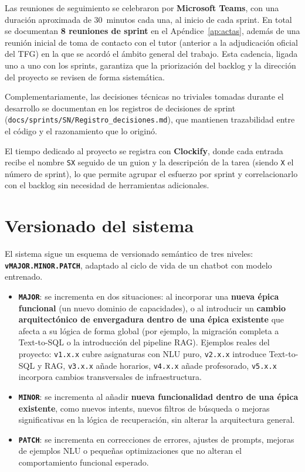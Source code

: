 Las reuniones de seguimiento se celebraron por \textbf{Microsoft Teams}, con una duración aproximada de 30~minutos cada una, al inicio de cada sprint. En total se documentan \textbf{8 reuniones de sprint} en el Apéndice~\ref{ap:actas}, además de una reunión inicial de toma de contacto con el tutor (anterior a la adjudicación oficial del TFG) en la que se acordó el ámbito general del trabajo. Esta cadencia, ligada uno a uno con los sprints, garantiza que la priorización del backlog y la dirección del proyecto se revisen de forma sistemática.

Complementariamente, las decisiones técnicas no triviales tomadas durante el desarrollo se documentan en los registros de decisiones de sprint (\texttt{docs/\allowbreak sprints/\allowbreak SN/\allowbreak Registro\_decisiones.md}), que mantienen trazabilidad entre el código y el razonamiento que lo originó.

El tiempo dedicado al proyecto se registra con \textbf{Clockify}, donde cada entrada recibe el nombre \texttt{SX} seguido de un guion y la descripción de la tarea (siendo \texttt{X} el número de sprint), lo que permite agrupar el esfuerzo por sprint y correlacionarlo con el backlog sin necesidad de herramientas adicionales.

\section{Versionado del sistema}
\label{sec:versionado}

El sistema sigue un esquema de versionado semántico de tres niveles: \textbf{\texttt{vMAJOR.MINOR.PATCH}}, adaptado al ciclo de vida de un chatbot con modelo entrenado.

\begin{itemize}
    \item \textbf{\texttt{MAJOR}}: se incrementa en dos situaciones: al incorporar una \textbf{nueva épica funcional} (un nuevo dominio de capacidades), o al introducir un \textbf{cambio arquitectónico de envergadura dentro de una épica existente} que afecta a su lógica de forma global (por ejemplo, la migración completa a Text-to-SQL o la introducción del pipeline RAG). Ejemplos reales del proyecto: \texttt{v1.x.x} cubre asignaturas con NLU puro, \texttt{v2.x.x} introduce Text-to-SQL y RAG, \texttt{v3.x.x} añade horarios, \texttt{v4.x.x} añade profesorado, \texttt{v5.x.x} incorpora cambios transversales de infraestructura.

    \item \textbf{\texttt{MINOR}}: se incrementa al añadir \textbf{nueva funcionalidad dentro de una épica existente}, como nuevos intents, nuevos filtros de búsqueda o mejoras significativas en la lógica de recuperación, sin alterar la arquitectura general.

    \item \textbf{\texttt{PATCH}}: se incrementa en correcciones de errores, ajustes de prompts, mejoras de ejemplos NLU o pequeñas optimizaciones que no alteran el comportamiento funcional esperado.
\end{itemize}


